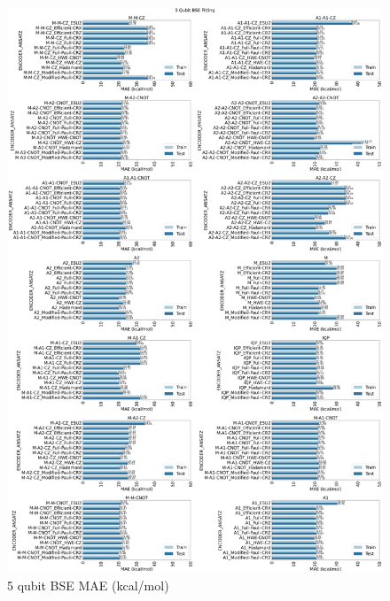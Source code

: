 \documentclass[journal=jacsat,manuscript=article]{achemso}
\begin{document}
\begin{figure}[H]
	\centering
	\includegraphics[width=\textwidth]{images/BSE/5qubit_BSE_MAE.png}
	\caption{5 qubit BSE MAE (kcal/mol)}
	\label{fig:5qubit_BSE_MAE}
\end{figure}
\end{document}
